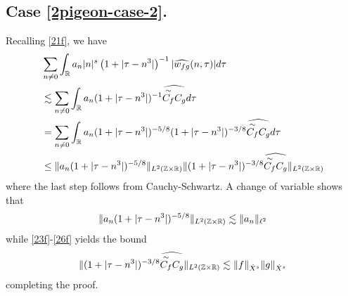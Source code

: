 \subsection{Case \ref{2pigeon-case-2}.} Recalling \eqref{21f}, we have
%
\begin{equation}
	\begin{split}
		& \sum_{n \neq 0} \int_{\mathbb{R}} a_n |n|^s \left( 1 + | \tau - n^3 | \right)^{-1} | 
		\widehat{w_{fg}}(n, \tau) | d \tau
		\\
		& \lesssim \sum_{n \neq 0}  \int_{\mathbb{R}} a_{n} (1+ | \tau - n^{3} |)^{-1} \widehat{\overset{\sim}{C_f} C_g} d
		\tau
	\\	
	& = \sum_{n \neq 0} \int_{\mathbb{R}} a_{n} (1+ | \tau - n^{3} |)^{-5/8} (1 + | \tau - n^{3}
	|)^{-3/8} \widehat{\overset{\sim}{C_f} C_g} d
		\tau
		\\
		& \le \|a_{n} (1 + | \tau - n^{3} |)^{-5/8}\|_{L^2(\mathbb{Z} \times \mathbb{R})}  \| (1 +
		| \tau - n^{3} |)^{-3/8} \widehat{\overset{\sim}{C_f} C_g}  \|_{L^2(\mathbb{Z} \times
		\mathbb{R})}
	\end{split}
\end{equation}
%
%
where the last step follows from Cauchy-Schwartz. A change of variable shows
that
%
%
\begin{equation*}
	\begin{split}
		\|a_{n} (1 + | \tau - n^{3} |)^{-5/8}\|_{L^2(\mathbb{Z} \times \mathbb{R})} \lesssim
		\|a_{n}\|_{\ell^2}
	\end{split}
\end{equation*}
%
%
while \eqref{23f}-\eqref{26f} yields the bound
%
%
\begin{equation*}
	\begin{split}
	\| (1 + | \tau - n^{3} |)^{-3/8} \widehat{\overset{\sim}{C_f} C_g}  \|_{L^2(\mathbb{Z}
	\times \mathbb{R})} \lesssim \|f\|_{\dot{X}^s} \|g\|_{\dot{X}^s}
	\end{split}
\end{equation*}
%
%
completing the proof. \qquad \qedsymbol
%
%
%
